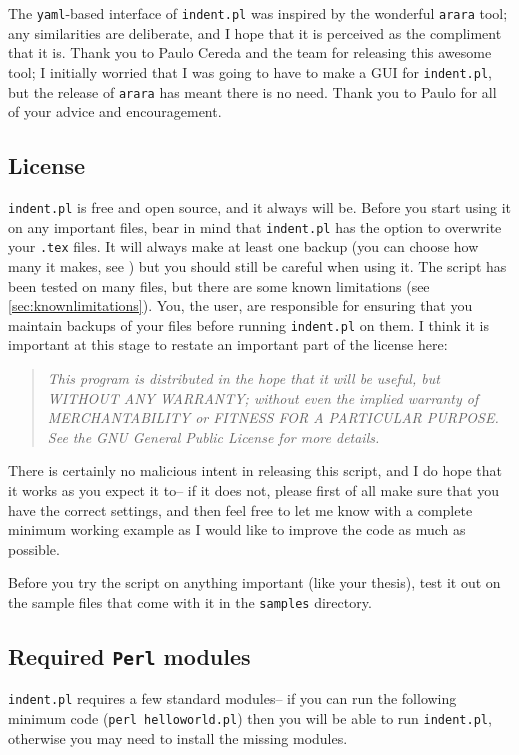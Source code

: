  	The \lstinline!yaml!-based interface of \lstinline!indent.pl! was inspired 
 	by the wonderful \lstinline!arara! tool; any similarities are deliberate, and 
 	I hope that it is perceived as the compliment that it is. Thank you to Paulo Cereda and the 
 	team for releasing this awesome tool; I initially worried that I was going to 
 	have to make a GUI for \lstinline!indent.pl!, but the release of \lstinline!arara! 
 	has meant there is no need. Thank you to Paulo for all of your advice and 
 	encouragement.
 	 	 	 	 	
 \subsection{License}
 	\lstinline!indent.pl! is free and open source, and it always will be.
 	Before you start using it on any important files, bear in mind that \lstinline!indent.pl! has the option to overwrite your \lstinline!.tex! files.
 	It will always make at least one backup (you can choose how many it makes, see )
 	but you should still be careful when using it. The script has been tested on many
 	files, but there are some known limitations (see \cref{sec:knownlimitations}). 
 	You, the user, are responsible for ensuring that you maintain backups of your files
 	before running \lstinline!indent.pl! on them. I think it is important at this
 	stage to restate an important part of the license here:
 	\begin{quote}\itshape
 		This program is distributed in the hope that it will be useful,
 		but WITHOUT ANY WARRANTY; without even the implied warranty of
 		MERCHANTABILITY or FITNESS FOR A PARTICULAR PURPOSE.  See the
 		GNU General Public License for more details.
 	\end{quote}
 	There is certainly no malicious intent in releasing this script, and I do hope
 	that it works as you expect it to-- if it does not, please first of all 
 	make sure that you have the correct settings, and then feel free to let me know with a 
 	complete minimum working example as I would like to improve the code as much as possible. 
 	 	 	 	 	
 	\begin{warning}
 		Before you try the script on anything important (like your thesis), test it 
 		out on the sample files that come with it in the \lstinline!samples! directory. 
 	\end{warning}
 	 	 	 	 	
 \subsection{Required \lstinline!Perl! modules}
 	\lstinline!indent.pl! requires a few standard modules-- if you can run the following
 	minimum code (\lstinline!perl helloworld.pl!) then you will be able to run \lstinline!indent.pl!, otherwise you may 
 	need to install the missing modules.
 	 	 	 	 	
